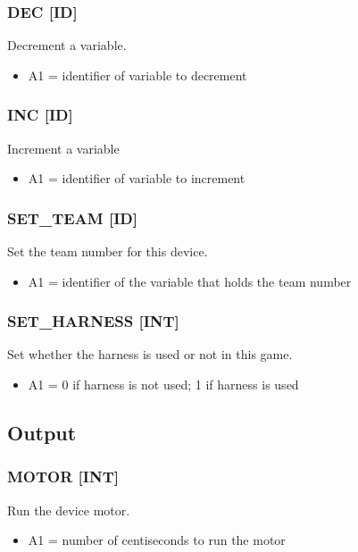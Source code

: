 \documentclass[12pt,a4paper]{scrbook}
\begin{document}
\subsubsection{DEC [ID]}
Decrement a variable.
\begin{itemize}
\item A1 = identifier of variable to decrement
\end{itemize}

\subsubsection{INC [ID]}
Increment a variable
\begin{itemize}
\item A1 = identifier of variable to increment
\end{itemize}

\subsubsection{SET\_TEAM [ID]}
Set the team number for this device.
\begin{itemize}
\item A1 = identifier of the variable that holds the team number
\end{itemize}

\subsubsection{SET\_HARNESS [INT]}
Set whether the harness is used or not in this game.
\begin{itemize}
\item A1 = 0 if harness is not used; 1 if harness is used
\end{itemize}






\subsection{Output}

\subsubsection{MOTOR [INT]}
Run the device motor.
\begin{itemize}
\item A1 = number of centiseconds to run the motor
\end{itemize}
\end{document}
